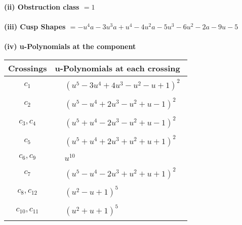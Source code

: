 \documentclass[1p]{elsarticle_modified}
\theoremstyle{definition}
\begin{document}
\flushleft \textbf{(ii) Obstruction class $= 1$}\\~\\
\flushleft \textbf{(iii) Cusp Shapes $= - u^4 a-3 u^3 a+u^4-4 u^2 a-5 u^3-6 u^2-2 a-9 u-5$}\\~\\
\newpage\renewcommand{\arraystretch}{1}
\flushleft \textbf{(iv) u-Polynomials at the component}\newline \\
\begin{tabular}{m{50pt}|m{274pt}}
Crossings & \hspace{64pt}u-Polynomials at each crossing \\
\hline $$\begin{aligned}c_{1}\end{aligned}$$&$\begin{aligned}
&(u^5-3 u^4+4 u^3- u^2- u+1)^2
\end{aligned}$\\
\hline $$\begin{aligned}c_{2}\end{aligned}$$&$\begin{aligned}
&(u^5- u^4+2 u^3- u^2+u-1)^2
\end{aligned}$\\
\hline $$\begin{aligned}c_{3},c_{4}\end{aligned}$$&$\begin{aligned}
&(u^5+u^4-2 u^3- u^2+u-1)^2
\end{aligned}$\\
\hline $$\begin{aligned}c_{5}\end{aligned}$$&$\begin{aligned}
&(u^5+u^4+2 u^3+u^2+u+1)^2
\end{aligned}$\\
\hline $$\begin{aligned}c_{6},c_{9}\end{aligned}$$&$\begin{aligned}
&u^{10}
\end{aligned}$\\
\hline $$\begin{aligned}c_{7}\end{aligned}$$&$\begin{aligned}
&(u^5- u^4-2 u^3+u^2+u+1)^2
\end{aligned}$\\
\hline $$\begin{aligned}c_{8},c_{12}\end{aligned}$$&$\begin{aligned}
&(u^2- u+1)^5
\end{aligned}$\\
\hline $$\begin{aligned}c_{10},c_{11}\end{aligned}$$&$\begin{aligned}
&(u^2+u+1)^5
\end{aligned}$\\
\hline
\end{tabular}\\~\\
\end{document}
